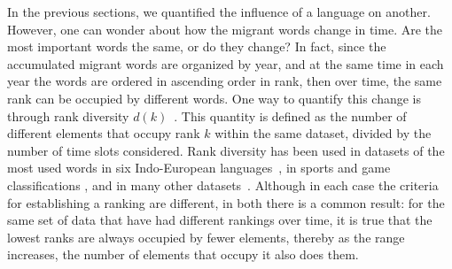 \documentclass[10pt,letterpaper]{article} %
\begin{document}
In the previous sections, we quantified the influence of a language on another. However, 
one can wonder about how the migrant words change in time. Are the most important words
the same, or do they change? In fact, 
since the accumulated migrant words are organized by year, and at the same time
in each year the words are ordered in ascending order in rank, then over time,
the same rank can be occupied by different words. One way to quantify
this change is through rank diversity $d(k)$~\cite{iplosone}. This quantity is
defined as the number 
of different elements that occupy rank  $k$ within the same dataset, divided
by the number of time slots considered.
Rank diversity has been used in datasets of the most used words in six
Indo-European languages~\cite{iplosone,10.3389/fphy.2018.00045,Cocho2019}, in sports and game classifications \cite{Morales_epj}, 
and in many other datasets~\cite{Iniguez2022}. 
Although in
each case the criteria for establishing a ranking are different, in both there
is a common result: for the same set of data that have had different rankings
over time, it is true that the lowest ranks are always occupied by fewer
elements, thereby as the range increases, the number of elements that occupy it
also does them.
\end{document}
